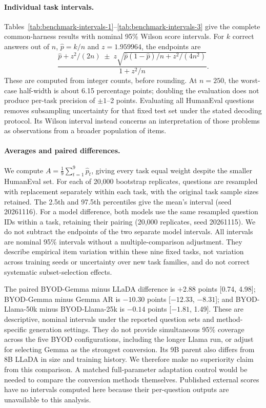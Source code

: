 \documentclass{article}
\begin{document}
\paragraph{Individual task intervals.} Tables~\ref{tab:benchmark-intervals-1}--\ref{tab:benchmark-intervals-3} give the complete common-harness results with nominal 95\% Wilson score intervals. For $k$ correct answers out of $n$, $\hat p=k/n$ and $z=1.959964$, the endpoints are
\begin{equation}
\frac{\hat p+z^2/(2n)\;\pm\;z\sqrt{\hat p(1-\hat p)/n+z^2/(4n^2)}}{1+z^2/n}.
\end{equation}
These are computed from integer counts, before rounding. At $n=250$, the worst-case half-width is about 6.15 percentage points; doubling the evaluation does not produce per-task precision of $\pm1$--2 points. Evaluating all HumanEval questions removes subsampling uncertainty for that fixed test set under the stated decoding protocol. Its Wilson interval instead concerns an interpretation of those problems as observations from a broader population of items.

\paragraph{Averages and paired differences.} We compute $A=\frac{1}{9}\sum_{t=1}^{9}\hat p_t$, giving every task equal weight despite the smaller HumanEval set. For each of 20,000 bootstrap replicates, questions are resampled with replacement separately within each task, with the original task sample sizes retained. The 2.5th and 97.5th percentiles give the mean's interval (seed 20261116). For a model difference, both models use the same resampled question IDs within a task, retaining their pairing (20,000 replicates, seed 20261115). We do not subtract the endpoints of the two separate model intervals. All intervals are nominal 95\% intervals without a multiple-comparison adjustment. They describe empirical item variation within these nine fixed tasks, not variation across training seeds or uncertainty over new task families, and do not correct systematic subset-selection effects.

The paired BYOD-Gemma minus LLaDA difference is +2.88 points [0.74, 4.98]; BYOD-Gemma minus Gemma AR is $-10.30$ points [$-12.33$, $-8.31$]; and BYOD-Llama-50k minus BYOD-Llama-25k is $-0.14$ points [$-1.81$, 1.49]. These are descriptive, nominal intervals under the reported question sets and method-specific generation settings. They do not provide simultaneous 95\% coverage across the five BYOD configurations, including the longer Llama run, or adjust for selecting Gemma as the strongest conversion. Its 9B parent also differs from 8B LLaDA in size and training history. We therefore make no superiority claim from this comparison. A matched full-parameter adaptation control would be needed to compare the conversion methods themselves. Published external scores have no intervals computed here because their per-question outputs are unavailable to this analysis.
\end{document}
